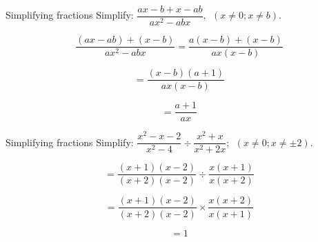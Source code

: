 \par
{}
\begin{wex}{Simplifying fractions}
{Simplify: $\dfrac{ax-b+x-ab}{a{x}^{2}-abx}, ~~(x \neq 0;x \neq b)$.}
{
\begin{equation*}
  \dfrac{(ax-ab)+(x-b)}{a{x}^{2}-abx} = \dfrac{a(x-b)+(x-b)}{ax(x-b)}
\end{equation*}

\begin{equation*}
  = \dfrac{(x-b)(a+1)}{ax(x-b)}
\end{equation*}

\begin{equation*}
  = \dfrac{a+1}{ax}
\end{equation*}
}
\end{wex}


\begin{wex}{Simplifying fractions}
{Simplify: $\dfrac{{x}^{2}-x-2}{{x}^{2}-4}÷\dfrac{{x}^{2}+x}{{x}^{2}+2x}; ~~(x \neq 0;x \neq \pm2)$.}{
\begin{equation*}
  = \dfrac{(x+1)(x-2)}{(x+2)(x-2)}÷\dfrac{x(x+1)}{x(x+2)}
\end{equation*}

\begin{equation*}
  = \dfrac{(x+1)(x-2)}{(x+2)(x-2)}\ensuremath{\times}\dfrac{x(x+2)}{x(x+1)}
\end{equation*}

\begin{equation*}
  = 1
\end{equation*}
}
\end{wex}

